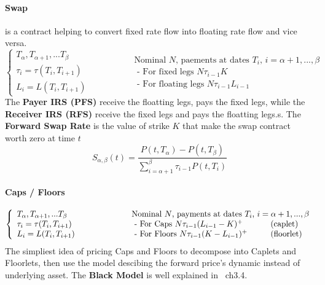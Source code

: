 \documentclass[a4paper,10pt]{article}
\begin{document}
\paragraph{Swap} is a contract helping to convert fixed rate flow into floating rate flow and vice versa. 
\[
\left\{
\begin{array}{l}
T_{\alpha},T_{\alpha+1},...T_{\beta} \\
\tau_i = \tau(T_i,T_{i+1})           \\
L_i    = L(T_i,T_{i+1})
\end{array}
\right.
\hspace{2cm}
\begin{array}{l}
\text{Nominal $N$, paements at dates $T_i$,  } i=\alpha+1,...,\beta \\
\text{ - For fixed legs    } N\tau_{i-1}K  \\
\text{ - For floating legs } N\tau_{i-1}L_{i-1}  
\end{array}
\]
The \textbf{Payer IRS (PFS)} receive the floatting legs, pays the fixed legs, while the \textbf{Receiver IRS (RFS)} receive the fixed legs and pays the floatting legs.s. The \textbf{Forward Swap Rate} is the value of strike $K$ that make the swap contract worth zero at time $t$
\[
S_{\alpha,\beta}(t) = \frac{P(t,T_{\alpha})-P(t,T_{\beta})}{\sum^{\beta}_{i=\alpha+1}\tau_{i-1}P(t,T_i)} 
\]
\paragraph{Caps / Floors}  
\[
\left\{
\begin{array}{l}
T_{\alpha},T_{\alpha+1},...T_{\beta} \\
\tau_i = \tau(T_i,T_{i+1})           \\
L_i    = L(T_i,T_{i+1})
\end{array}
\right.
\hspace{2cm}
\begin{array}{l}  
\text{Nominal $N$, payments at dates $T_i$,  } i=\alpha+1,...,\beta   \\
\text{ - For Caps    } N\tau_{i-1}(L_{i-1}-K)^+ \hspace{1.2 cm}\text{(caplet)}              \\
\text{ - For Floors  } N\tau_{i-1}(K-L_{i-1})^+ \hspace{1cm}\text{(floorlet)}
\end{array}
\]
The simpliest idea of pricing Caps and Floors to decompose into Caplets and Floorlets, then use the model descibing the forward price's dynamic instead of underlying asset. The \textbf{Black Model} is well explained in ~\cite{MAREK2009}ch3.4.
\end{document}
